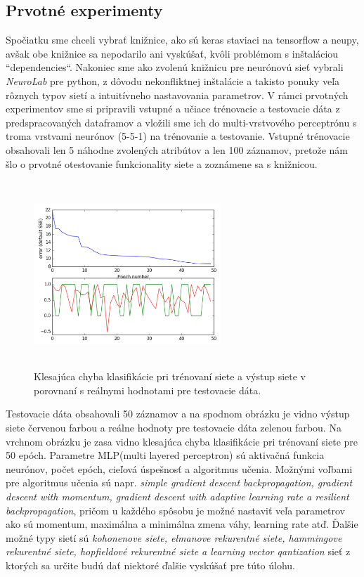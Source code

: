 \documentclass{iitsrc}
\begin{document}
\begin{multicols}{2}
\section{Prvotné experimenty}
Spočiatku sme chceli vybrať knižnice, ako sú keras staviaci na tensorflow a neupy, avšak obe knižnice sa nepodarilo ani vyskúšať, kvôli problémom s inštaláciou ``dependencies``. Nakoniec sme ako zvolenú knižnicu pre neurónovú sieť vybrali \emph{NeuroLab} pre python, z dôvodu nekonfliktnej inštalácie a takisto ponuky veľa rôznych typov sietí a intuitívneho nastavovania parametrov.
%
V rámci prvotných experimentov sme si pripravili vstupné a učiace trénovacie a testovacie dáta z predspracovaných dataframov a vložili sme ich do multi-vrstvového perceptrónu s troma vrstvami neurónov (5-5-1) na trénovanie a testovanie. Vstupné trénovacie obsahovali len 5 náhodne zvolených atribútov a len 100 záznamov, pretože nám šlo o prvotné otestovanie funkcionality siete a zoznámene sa s knižnicou.
%
\begin{figure}[H]
    \begin{center}
        \includegraphics[width=7cm,height=7cm]{results}
        \caption{Klesajúca chyba klasifikácie pri trénovaní siete a výstup siete v porovnaní s reálnymi hodnotami pre testovacie dáta.}
    \end{center}
\end{figure}
%
Testovacie dáta obsahovali 50 záznamov a na spodnom obrázku je vidno výstup siete červenou farbou a reálne hodnoty pre testovacie dáta zelenou farbou. Na vrchnom obrázku je zasa vidno klesajúca chyba klasifikácie pri trénovaní siete pre 50 epóch.
%
Parametre MLP(multi layered perceptron) sú aktivačná funkcia neurónov, počet epóch, cieľová úspešnosť  a  algoritmus učenia. Možnými voľbami pre algoritmus učenia sú napr. \emph{simple gradient descent backpropagation, gradient descent with momentum, gradient descent with adaptive learning rate a resilient backpropagation}, pričom u každého spôsobu je možné nastaviť veľa parametrov ako sú momentum, maximálna a minimálna zmena váhy, learning rate atď. 
%
Ďalšie možné typy sietí sú \emph{kohonenove siete, elmanove rekurentné siete, hammingove rekurentné siete, hopfieldové rekurentné siete a learning vector qantization} sieť z ktorých sa určite budú dať niektoré ďalšie vyskúšať pre túto úlohu.


\end{multicols}
\end{document}
